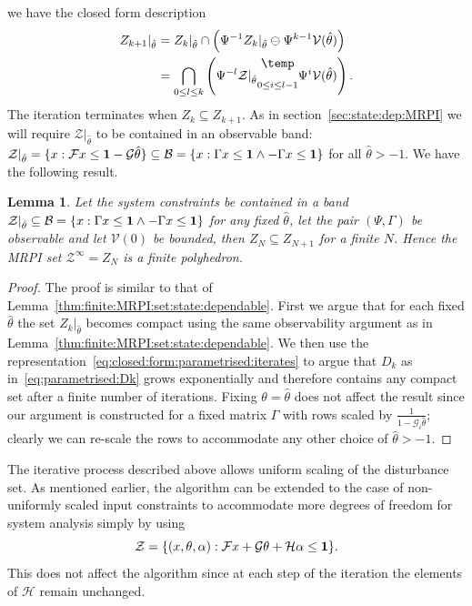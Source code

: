 \documentclass[letterpaper, 10pt, conference]{ieeeconf} %
\newtheorem{thm}{Lemma}[section]
\newcommand{\bigominus}{\raisebox{10pt}{$\temp$}}
\begin{document}
we have the closed form description
%
\begin{equation}\label{eq:closed:form:parametrised:iterates}
\begin{split}
	Z_{k+1}\vert_{\hat\theta} &= Z_{k}\vert_{\hat\theta}\cap\left(
	\Psi^{-1}Z_k\vert_{\hat\theta}\ominus\Psi^{k-1}\mathcal V(\hat\theta)\right)\\
	&=\bigcap_{0\leq l\leq k}\left(\Psi^{-l}\mathcal Z\vert_{\hat\theta}\underset{0\leq i\leq l-1}{\bigominus} 
	\Psi^i \mathcal V(\hat\theta)
	\right).
\end{split}
\end{equation}
%
The iteration terminates when $Z_k\subseteq Z_{k+1}$. As in section~\ref{sec:state:dep:MRPI}
we will require $\mathcal Z\vert_{\hat\theta}$ to be contained in an observable band: $\mathcal Z\vert_{\hat\theta}=\{x:\mathcal Fx \leq {\bf{1}}-\mathcal G\hat\theta\}\subseteq
\mathcal B=\{x:\Gamma x\leq {\bf{1}}\wedge -\Gamma x\leq {\bf{1}}\}$ for all $\hat\theta>-1$. We have the following result.
%
\begin{thm}
Let the system constraints be contained in a band $\mathcal Z\vert_{\hat\theta}\subseteq\mathcal 
B=\{x:\Gamma x\leq {\bf{1}}\wedge -\Gamma x\leq {\bf{1}}\}$ for any fixed $\hat\theta$, let the
pair $(\Psi,\Gamma)$ be observable and let $\mathcal V(0)$ be bounded, then $Z_N\subseteq Z_{N+1}$
for a finite $N$. Hence the MRPI set $\mathcal Z^\infty = Z_N$ is a finite polyhedron.
\end{thm}
%
\begin{proof}
The proof is similar to that of Lemma~\ref{thm:finite:MRPI:set:state:dependable}.
First we argue that for each fixed $\hat\theta$ the set $Z_k\vert_{\hat\theta}$ becomes compact using the same
observability argument as in Lemma~\ref{thm:finite:MRPI:set:state:dependable}.
We then use the representation~\eqref{eq:closed:form:parametrised:iterates} to argue that $D_k$ as
in~\eqref{eq:parametrised:Dk} grows exponentially and therefore contains any compact set after a finite number
of iterations. Fixing $\theta=\hat\theta$ does not affect the result since
our argument is constructed for a fixed matrix $\Gamma$ with rows scaled by 
$\frac{1}{1-\mathcal G_i\hat\theta}$; clearly we can re-scale the rows to accommodate any other choice of $\hat\theta>-1$.
\end{proof}

The iterative process described above allows uniform scaling of the disturbance set. As mentioned earlier, the algorithm can be extended to the case of non-uniformly scaled input constraints to accommodate more degrees of freedom for 
system analysis simply by using 
\[
\mathcal Z = \{(x,\theta,\alpha): \mathcal F x + \mathcal G\theta + 
\mathcal H \alpha \leq {\bf{1}}\}.
\]
This does not affect the algorithm since at each step of the iteration 
the elements of $\mathcal H$ remain unchanged. 
%
%
%
%
%
%
\end{document}
